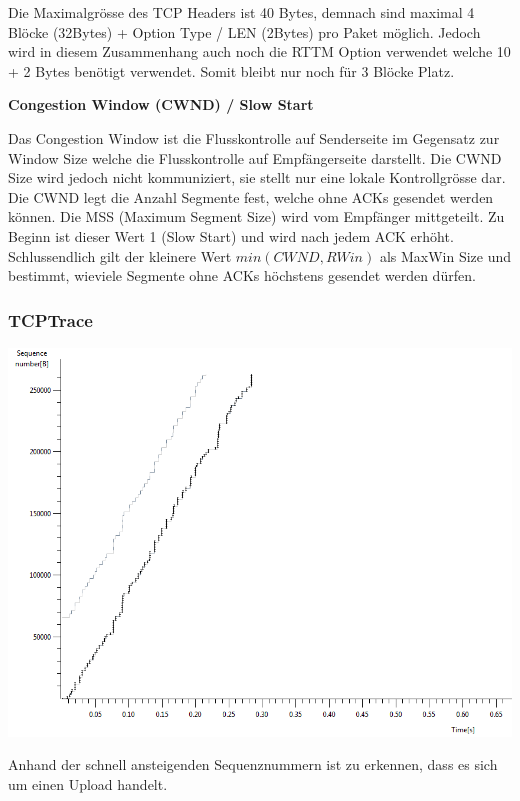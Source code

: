 Die Maximalgrösse des TCP Headers ist 40 Bytes, demnach sind maximal 4 Blöcke
(32Bytes) + Option Type / LEN (2Bytes) pro Paket möglich. Jedoch wird in diesem
Zusammenhang auch noch die RTTM Option verwendet welche 10 + 2 Bytes benötigt
verwendet. Somit bleibt nur noch für 3 Blöcke Platz.

\textbf{Congestion Window (CWND) / Slow Start}

Das Congestion Window ist die Flusskontrolle auf Senderseite im Gegensatz zur
Window Size welche die Flusskontrolle auf Empfängerseite darstellt. Die CWND
Size wird jedoch nicht kommuniziert, sie stellt nur eine lokale Kontrollgrösse
dar. Die CWND legt die Anzahl Segmente fest, welche ohne ACKs gesendet werden
können. Die MSS (Maximum Segment Size) wird vom Empfänger mittgeteilt. Zu Beginn
ist dieser Wert 1 (Slow Start) und wird nach jedem ACK erhöht. Schlussendlich
gilt der kleinere Wert $min(CWND, RWin)$ als MaxWin Size und bestimmt, wieviele
Segmente ohne ACKs höchstens gesendet werden dürfen.

\subsubsection{TCPTrace}

\includegraphics[scale=0.45]{media/tcptraceUpload.png}

Anhand der schnell ansteigenden Sequenznummern ist zu erkennen, dass es sich um
einen Upload handelt.


